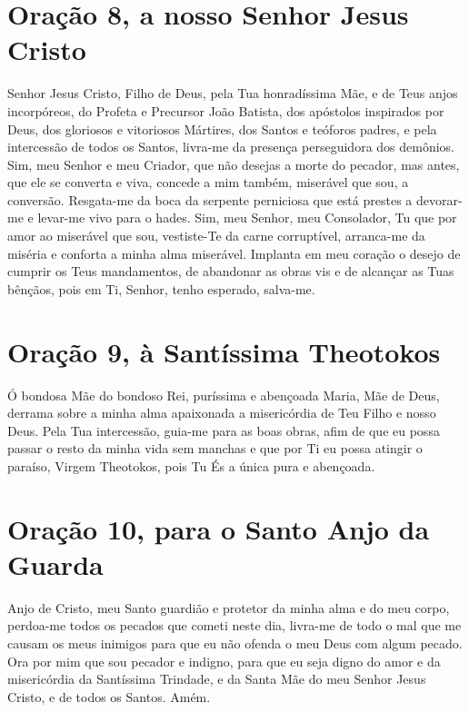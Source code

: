 \documentclass{subfiles}
\begin{document}
\section*{Oração 8, a nosso Senhor Jesus Cristo}

Senhor Jesus Cristo, Filho de Deus, pela Tua honradíssima Mãe, e de Teus anjos
incorpóreos, do Profeta e Precursor João Batista, dos apóstolos inspirados por
Deus, dos gloriosos e vitoriosos Mártires, dos Santos e teóforos padres, e pela
intercessão de todos os Santos, livra-me da presença perseguidora dos demônios.
Sim, meu Senhor e meu Criador, que não desejas a morte do pecador, mas antes,
que ele se converta e viva, concede a mim também, miserável que sou, a
conversão. Resgata-me da boca da serpente perniciosa que está prestes a
devorar-me e levar-me vivo para o hades. Sim, meu Senhor, meu Consolador, Tu que
por amor ao miserável que sou, vestiste-Te da carne corruptível, arranca-me da
miséria e conforta a minha alma miserável. Implanta em meu coração o desejo de
cumprir os Teus mandamentos, de abandonar as obras vis e de alcançar as Tuas
bênçãos, pois em Ti, Senhor, tenho esperado, salva-me.
 
\section*{Oração 9, à Santíssima Theotokos}

Ó bondosa Mãe do bondoso Rei, puríssima e abençoada Maria, Mãe
de Deus, derrama sobre a minha alma apaixonada a misericórdia de Teu Filho
e nosso Deus. Pela Tua intercessão, guia-me para as boas obras, afim de que
eu possa passar o resto da minha vida sem manchas e que por Ti eu possa
atingir o paraíso, Virgem Theotokos, pois Tu És a única pura e abençoada.

\section*{Oração 10, para o Santo Anjo da Guarda}

Anjo de Cristo, meu Santo guardião e protetor da minha alma e do meu
corpo, perdoa-me todos os pecados que cometi neste dia, livra-me de todo o
mal que me causam os meus inimigos para que eu não ofenda o meu Deus
com algum pecado. Ora por mim que sou pecador e indigno, para que eu seja
digno do amor e da misericórdia da Santíssima Trindade, e da Santa Mãe do
meu Senhor Jesus Cristo, e de todos os Santos. Amém.

\end{document}
